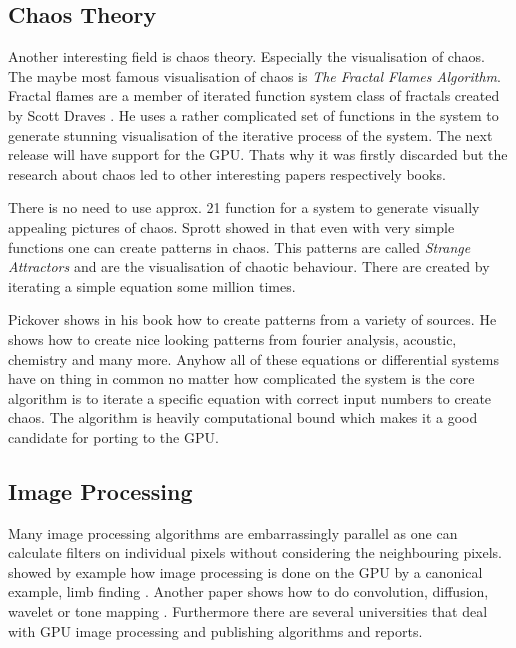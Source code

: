 \subsection{Chaos Theory} %
\label{par:chaos_theory}
Another interesting field is chaos theory. Especially the visualisation of
chaos. The maybe most famous visualisation of chaos is \emph{The Fractal Flames
Algorithm}. Fractal flames are a member of iterated function system class of
fractals created by Scott Draves \citep{citeulike:3801950}. He uses a rather
complicated set of functions in the system to generate stunning visualisation of
the iterative process of the system. The next release will have support for the
GPU. Thats why it was firstly discarded but the research about chaos led to
other interesting papers respectively books.

There is no need to use approx. 21 function for a system to generate visually
appealing pictures of chaos. Sprott showed in \citep{citeulike:3745535} that even
with very simple functions one can create patterns in chaos. This patterns are
called \emph{Strange Attractors} and are the visualisation of chaotic behaviour.
There are created by iterating a simple equation some million times. 

Pickover shows in his book \citep{citeulike:3812233} how to create patterns from
a variety of sources. He shows how to create nice looking patterns from fourier
analysis, acoustic, chemistry and many more. Anyhow all of these equations or
differential systems have on thing in common no matter how complicated the
system is the core algorithm is to iterate a specific equation with correct
input numbers to create chaos. The algorithm is heavily computational bound
which makes it a good candidate for porting to the \gls{GPU}.


\subsection{Image Processing}
Many image processing algorithms are embarrassingly parallel as one can calculate
filters on individual pixels without considering the neighbouring pixels. 
 showed by example how image processing is done
on the \gls{GPU} by a canonical example, limb finding \citep{citeulike:6661950}. 
Another paper shows how to do convolution, diffusion, wavelet or tone mapping
\citep{citeulike:6661954}. Furthermore there are several universities that
deal with \gls{GPU} image processing and publishing algorithms and reports. 



